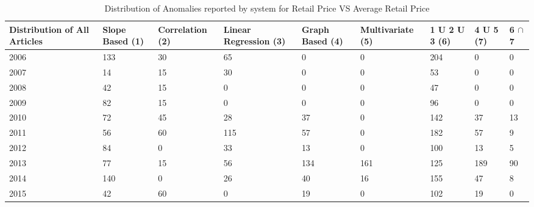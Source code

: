 \documentclass[a4paper,10pt]{report}
\begin{document}
	
	
	
	\begin{table}[]
	\centering
	\resizebox{\textwidth}{!}
	{\begin{tabular}{|l|l|l|l|l|l|l|l|l|}
	\hline
	Distribution of All Articles & Slope Based (1) & Correlation (2) & Linear Regression (3) & Graph Based (4) & Multivariate (5) & 1 U 2 U 3 (6) & 4 U 5 (7) & 6 $\cap$ 7 \\
	\hline
	2006 & 133 & 30 & 65  & 0   & 0   & 204 & 0   & 0  \\
	\hline
	2007 & 14  & 15 & 30  & 0   & 0   & 53  & 0   & 0  \\
	\hline
	2008 & 42  & 15 & 0   & 0   & 0   & 47  & 0   & 0  \\
	\hline
	2009 & 82  & 15 & 0   & 0   & 0   & 96  & 0   & 0  \\
	\hline
	2010 & 72  & 45 & 28  & 37  & 0   & 142 & 37  & 13 \\
	\hline
	2011 & 56  & 60 & 115 & 57  & 0   & 182 & 57  & 9  \\
	\hline
	2012 & 84  & 0  & 33  & 13  & 0   & 100 & 13  & 5  \\
	\hline
	2013 & 77  & 15 & 56  & 134 & 161 & 125 & 189 & 90 \\
	\hline
	2014 & 140 & 0  & 26  & 40  & 16  & 155 & 47  & 8  \\
	\hline
	2015 & 42  & 60 & 0   & 19  & 0   & 102 & 19  & 0  \\
	\hline
	\end{tabular}}
	\caption{Distribution of Anomalies reported by system for Retail Price VS Average Retail Price}
	\label{RetailVsAverageDist}
	\end{table}
	  
	  
	  
\end{document}
